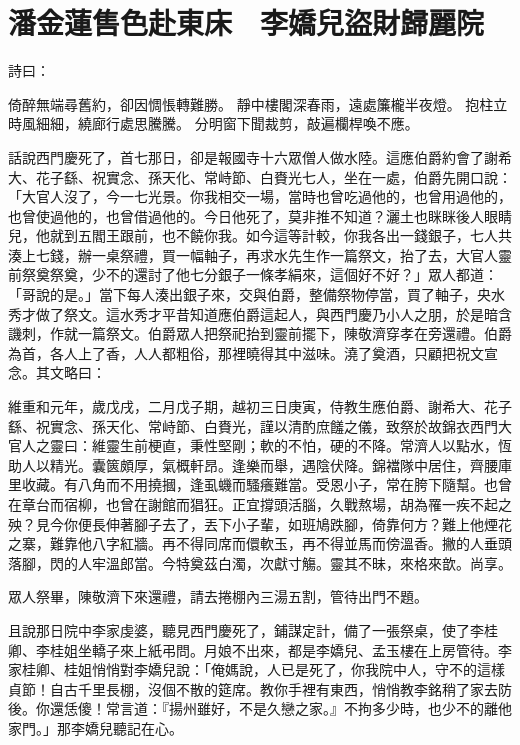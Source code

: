 %

\chapter{潘金蓮售色赴東床　李嬌兒盜財歸麗院}

詩曰：

倚醉無端尋舊約，卻因惆悵轉難勝。
靜中樓閣深春雨，遠處簾櫳半夜燈。
抱柱立時風細細，繞廊行處思騰騰。
分明窗下聞裁剪，敲遍欄桿喚不應。

話說西門慶死了，首七那日，卻是報國寺十六眾僧人做水陸。這應伯爵約會了謝希大、花子繇、祝實念、孫天化、常峙節、白賚光七人，坐在一處，伯爵先開口說： 「大官人沒了，今一七光景。你我相交一場，當時也曾吃過他的，也曾用過他的，也曾使過他的，也曾借過他的。今日他死了，莫非推不知道？灑土也眯眯後人眼睛兒，他就到五閻王跟前，也不饒你我。如今這等計較，你我各出一錢銀子，七人共湊上七錢，辦一桌祭禮，買一幅軸子，再求水先生作一篇祭文，抬了去，大官人靈前祭奠祭奠，少不的還討了他七分銀子一條孝絹來，這個好不好？」眾人都道：「哥說的是。」當下每人湊出銀子來，交與伯爵，整備祭物停當，買了軸子，央水秀才做了祭文。這水秀才平昔知道應伯爵這起人，與西門慶乃小人之朋，於是暗含譏刺，作就一篇祭文。伯爵眾人把祭祀抬到靈前擺下，陳敬濟穿孝在旁還禮。伯爵為首，各人上了香，人人都粗俗，那裡曉得其中滋味。澆了奠酒，只顧把祝文宣念。其文略曰：

維重和元年，歲戊戌，二月戊子期，越初三日庚寅，侍教生應伯爵、謝希大、花子繇、祝實念、孫天化、常峙節、白賚光，謹以清酌庶饈之儀，致祭於故錦衣西門大官人之靈曰：維靈生前梗直，秉性堅剛；軟的不怕，硬的不降。常濟人以點水，恆助人以精光。囊篋頗厚，氣概軒昂。逢樂而舉，遇陰伏降。錦襠隊中居住，齊腰庫里收藏。有八角而不用撓摑，逢虱蟣而騷癢難當。受恩小子，常在胯下隨幫。也曾在章台而宿柳，也曾在謝館而猖狂。正宜撐頭活腦，久戰熬場，胡為罹一疾不起之殃？見今你便長伸著腳子去了，丟下小子輩，如班鳩跌腳，倚靠何方？難上他煙花之寨，難靠他八字紅牆。再不得同席而儇軟玉，再不得並馬而傍溫香。撇的人垂頭落腳，閃的人牢溫郎當。今特奠茲白濁，次獻寸觴。靈其不昧，來格來歆。尚享。

眾人祭畢，陳敬濟下來還禮，請去捲棚內三湯五割，管待出門不題。

且說那日院中李家虔婆，聽見西門慶死了，鋪謀定計，備了一張祭桌，使了李桂卿、李桂姐坐轎子來上紙弔問。月娘不出來，都是李嬌兒、孟玉樓在上房管待。李家桂卿、桂姐悄悄對李嬌兒說：「俺媽說，人已是死了，你我院中人，守不的這樣貞節！自古千里長棚，沒個不散的筵席。教你手裡有東西，悄悄教李銘稍了家去防後。你還恁傻！常言道：『揚州雖好，不是久戀之家。』不拘多少時，也少不的離他家門。」那李嬌兒聽記在心。

